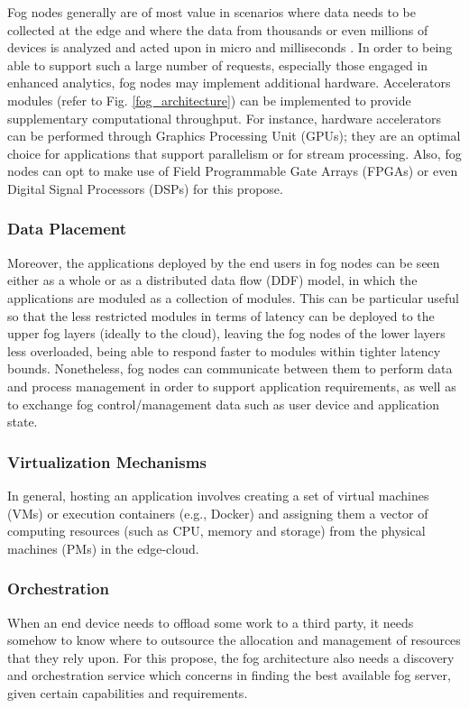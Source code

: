 \noindent\tab Fog nodes generally are of most value in scenarios where data needs to be collected at the edge and where the data from thousands or even millions of devices is analyzed and acted upon in micro and milliseconds \cite{openfog2017openfog}. In order to being able to support such a large number of requests, especially those engaged in enhanced analytics, fog nodes may implement additional hardware. Accelerators modules (refer to Fig. \ref{fog_architecture}) can be implemented to provide supplementary computational throughput. For instance, hardware accelerators can be performed through Graphics Processing Unit (GPUs); they are an optimal choice for applications that support parallelism or for stream processing. Also, fog nodes can opt to make use of Field Programmable Gate Arrays (FPGAs) or even Digital Signal Processors (DSPs) for this propose.
\subsubsection{Data Placement}

\noindent\tab Moreover, the applications deployed by the end users in fog nodes can be seen either as a whole or as a distributed data flow (DDF) model, in which the applications are moduled as a collection of modules. This can be particular useful so that the less restricted modules in terms of latency can be deployed to the upper fog layers (ideally to the cloud), leaving the fog nodes of the lower layers less overloaded, being able to respond faster to modules within tighter latency bounds. Nonetheless, fog nodes can communicate between them to perform data and process management in order to support application requirements, as well as to exchange fog control/management data such as user device and application state.\\

\subsubsection{Virtualization Mechanisms}

In general, hosting an application involves creating a set of virtual machines (VMs) or execution containers (e.g., Docker) and assigning them a vector of computing resources (such as CPU, memory and storage) from the physical machines (PMs) in the edge-cloud.

\subsubsection{Orchestration}
\noindent\tab When an end device needs to offload some work to a third party, it needs somehow to know where to outsource the allocation and management of resources that they rely upon. For this propose, the fog architecture also needs a discovery and orchestration service which concerns in finding the best available fog server, given certain capabilities and requirements.\\

